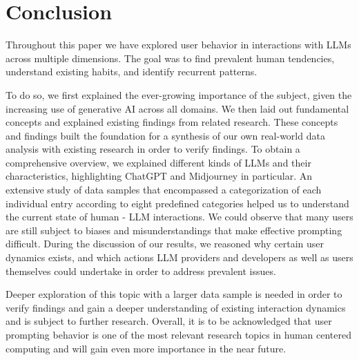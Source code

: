 \section{Conclusion}
\label{sec:conclusion}

Throughout this paper we have explored user behavior in interactions with LLMs across multiple
dimensions.
The goal was to find prevalent human tendencies, understand existing habits, and identify recurrent
patterns.

To do so, we first explained the ever-growing importance of the subject, given the increasing
use of generative AI across all domains.
We then laid out fundamental concepts and explained existing findings from related research.
These concepts and findings built the foundation for a synthesis of our own real-world
data analysis with existing research in order to verify findings.
To obtain a comprehensive overview, we explained different kinds of LLMs and their
characteristics, highlighting ChatGPT and Midjourney in particular.
An extensive study of data samples that encompassed a categorization of each individual
entry according to eight predefined categories helped us to understand the current state of
human - LLM interactions.
We could observe that many users are still subject to biases and misunderstandings that make
effective prompting difficult.
During the discussion of our results, we reasoned why certain user dynamics exists, and which
actions LLM providers and developers as well as users themselves could undertake in order to
address prevalent issues.

Deeper exploration of this topic with a larger data sample is needed in order to
verify findings and gain a deeper understanding of existing interaction dynamics and is subject to
further research.
Overall, it is to be acknowledged that user prompting behavior is one of the most relevant
research topics in human centered computing and will gain even more importance in the near future.
